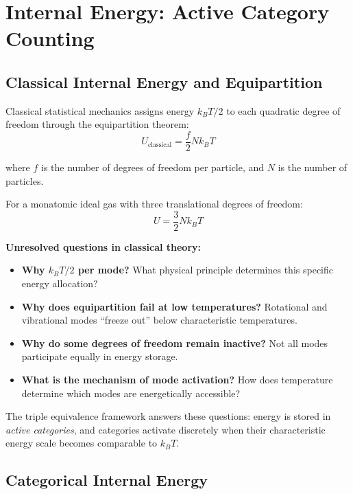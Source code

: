 \section{Internal Energy: Active Category Counting}
\label{sec:internal_energy}

\subsection{Classical Internal Energy and Equipartition}

Classical statistical mechanics assigns energy $k_B T/2$ to each quadratic degree of freedom through the equipartition theorem:
\begin{equation}
U_{\text{classical}} = \frac{f}{2} N k_B T
\end{equation}

where $f$ is the number of degrees of freedom per particle, and $N$ is the number of particles.

For a monatomic ideal gas with three translational degrees of freedom:
\begin{equation}
U = \frac{3}{2} N k_B T
\end{equation}

\textbf{Unresolved questions in classical theory:}
\begin{itemize}
\item \textbf{Why $k_B T/2$ per mode?} What physical principle determines this specific energy allocation?
\item \textbf{Why does equipartition fail at low temperatures?} Rotational and vibrational modes ``freeze out'' below characteristic temperatures.
\item \textbf{Why do some degrees of freedom remain inactive?} Not all modes participate equally in energy storage.
\item \textbf{What is the mechanism of mode activation?} How does temperature determine which modes are energetically accessible?
\end{itemize}

The triple equivalence framework answers these questions: energy is stored in \textit{active categories}, and categories activate discretely when their characteristic energy scale becomes comparable to $k_B T$.

\subsection{Categorical Internal Energy}

